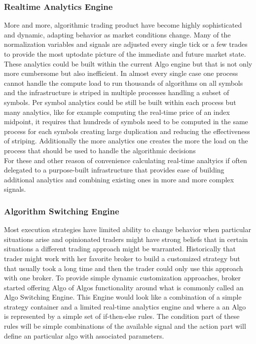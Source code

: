 \subsubsection{Realtime Analytics Engine}
More and more, algorithmic trading product have become highly sophisticated and dynamic, adapting behavior as market conditions change. Many of the normalization variables and signals are adjusted every single tick or a few trades to provide the most uptodate picture of the immediate and future market state. These analytics could be built within the current Algo engine but that is not only more cumbersome but also inefficient. In almost every single case one process cannot handle the compute load to run thousands of algorithms on all symbols and the infrastructure is striped in multiple processes handling a subset of symbols. Per symbol analytics could be still be built within each process but many analytics, like for example computing the real-time price of an index midpoint, it requires that hundreds of symbols need to be computed in the same process for each symbols creating large duplication and reducing the effectiveness of striping. Additionally the more analytics one creates the more the load on the process that should be used to handle the algorithmic decisions\\

For these and other reason of convenience calculating real-time analtyics if often delegated to a purpose-built infrastructure that provides ease of building additional analytics and combining existing ones in more and more complex signals. 

\subsubsection{Algorithm Switching Engine}
Most execution strategies have limited ability to change behavior when particular situations arise and opinionated traders might have strong beliefs that in certain situations a different trading approach might be warranted. Historically that trader might work with her favorite broker to build a customized strategy but that usually took a long time and then the trader could only use this approach with one broker. To provide simple dynamic customization approaches, broker started offering Algo of Algos functionality around what is commonly called an Algo Switching Engine. This Engine would look like a combination of a simple strategy container and a limited real-time analytics engine and where a an Algo is represented by a simple set of if-then-else rules. The condition  part of these rules will be simple combinations of the available signal and the action part will define an particular algo with associated parameters. \\

